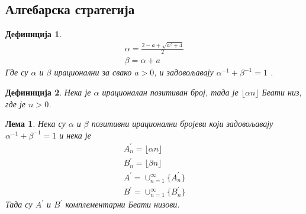 \documentclass[a4paper]{article}
\newtheorem{lemma}{Лема}
\newtheorem{definition}{Дефиниција}
\begin{document}
\subsection{Алгебарска стратегија}

\begin{definition}
	\label{def:alpha_beta}
	\begin{eqnarray}
		\alpha = \frac{2 - a + \sqrt{a^2 + 4}}{2} \\  
		\beta = \alpha + a
	\end{eqnarray}
	Где су $ \alpha $ и $ \beta $ ирационални за свако $ a > 0 $, и задовољавају $ \alpha^{-1} + \beta^{-1} = 1 $ .
\end{definition}

\begin{definition}
	\label{def:beati_niz}
	Нека је $ \alpha $ ирационалан позитиван број, тада је $ \lfloor \alpha n \rfloor $ Беати низ, где је $ n > 0 $.
\end{definition}

\begin{lemma}
	Нека су $ \alpha $ и $ \beta $ позитивни ирационални бројеви који задовољавају $ \alpha^{-1} + \beta^{-1} = 1 $ и нека је 
	\begin{eqnarray} 
		A_{n}^{'} = \lfloor \alpha n \rfloor\\
		B_{n}^{'} = \lfloor \beta n \rfloor\\
		A^{'} = \cup_{n=1}^{\infty}\{A_{n}^{'}\}\\
		B^{'} = \cup_{n=1}^{\infty}\{B_{n}^{'}\}
	\end{eqnarray}
	Тада су $ A^{'} $ и $ B^{'} $ комплементарни Беати низови.
\end{lemma}
\end{document}
